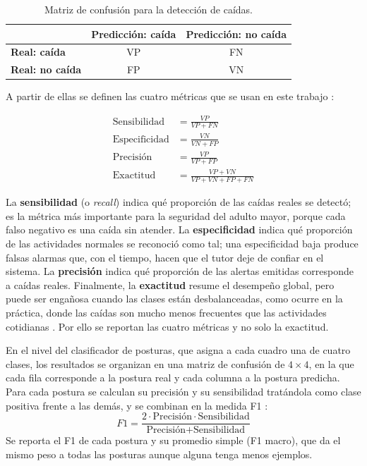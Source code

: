 \documentclass[12pt,a4paper,oneside]{book}
\theoremstyle{plain}
\theoremstyle{definition}
\theoremstyle{remark}
\begin{document}
\begin{table}[htbp]
\centering
\caption{Matriz de confusión para la detección de caídas.}
\label{tab:matriz-confusion}
\begin{tabular}{lcc}
\toprule
 & \textbf{Predicción: caída} & \textbf{Predicción: no caída} \\
\midrule
\textbf{Real: caída} & VP & FN \\
\addlinespace
\textbf{Real: no caída} & FP & VN \\
\bottomrule
\end{tabular}
\end{table}

A partir de ellas se definen las cuatro métricas que se usan en este trabajo \parencite{sokolova2009systematic}:

\begin{align}
\text{Sensibilidad} &= \frac{VP}{VP + FN} \label{eq:sensibilidad}\\[4pt]
\text{Especificidad} &= \frac{VN}{VN + FP} \label{eq:especificidad}\\[4pt]
\text{Precisión} &= \frac{VP}{VP + FP} \label{eq:precision}\\[4pt]
\text{Exactitud} &= \frac{VP + VN}{VP + VN + FP + FN} \label{eq:exactitud}
\end{align}

La \textbf{sensibilidad} (o \textit{recall}) indica qué proporción de las caídas reales se detectó; es la métrica más importante para la seguridad del adulto mayor, porque cada falso negativo es una caída sin atender. La \textbf{especificidad} indica qué proporción de las actividades normales se reconoció como tal; una especificidad baja produce falsas alarmas que, con el tiempo, hacen que el tutor deje de confiar en el sistema. La \textbf{precisión} indica qué proporción de las alertas emitidas corresponde a caídas reales. Finalmente, la \textbf{exactitud} resume el desempeño global, pero puede ser engañosa cuando las clases están desbalanceadas, como ocurre en la práctica, donde las caídas son mucho menos frecuentes que las actividades cotidianas \parencite{sokolova2009systematic}. Por ello se reportan las cuatro métricas y no solo la exactitud.

En el nivel del clasificador de posturas, que asigna a cada cuadro una de cuatro clases, los resultados se organizan en una matriz de confusión de $4 \times 4$, en la que cada fila corresponde a la postura real y cada columna a la postura predicha. Para cada postura se calculan su precisión y su sensibilidad tratándola como clase positiva frente a las demás, y se combinan en la medida F1 \parencite{sokolova2009systematic}:
\begin{equation}
F1 = \frac{2 \cdot \text{Precisión} \cdot \text{Sensibilidad}}{\text{Precisión} + \text{Sensibilidad}}
\label{eq:f1}
\end{equation}
Se reporta el F1 de cada postura y su promedio simple (F1 macro), que da el mismo peso a todas las posturas aunque alguna tenga menos ejemplos.
\end{document}
